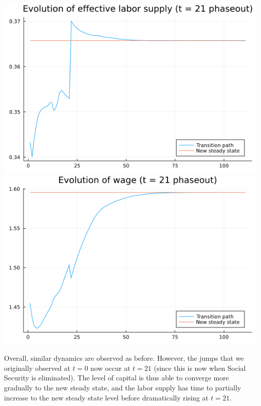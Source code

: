 \documentclass[12pt]{article}
\begin{document}
\begin{center}
    \includegraphics[scale= 0.35]{lplot_21.png}\includegraphics[scale= 0.35]{wplot_21.png}
\end{center}
Overall, similar dynamics are observed as before. However, the jumps that we originally observed at $t = 0$ now occur at $t = 21$ (since this is now when Social Security is eliminated). The level of capital is thus able to converge more gradually to the new steady state, and the labor supply has time to partially increase to the new steady state level before dramatically rising at $t = 21$. 
\end{document}
